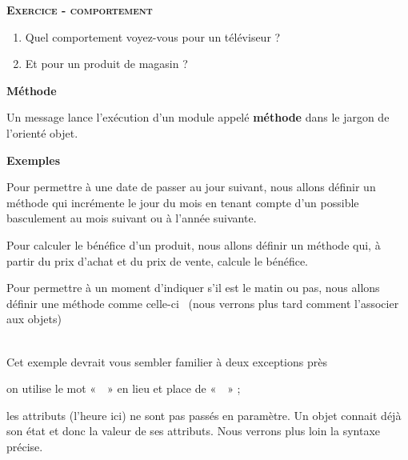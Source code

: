 {\sffamily\bfseries\scshape
Exercice - comportement}

\begin{enumerate}
	\item {
		Quel comportement voyez-vous pour un téléviseur ?}
	\item {
		Et pour un produit de magasin ?}
\end{enumerate}

\bigskip

{\sffamily\bfseries\upshape
Méthode}

{Un message lance l'exécution d'un
module appelé \textbf{méthode} dans le jargon de
l'orienté objet. }

{\bfseries
Exemples}

\begin{liste}
	\item {
		Pour permettre à une date de passer au jour suivant, nous allons définir
		un méthode qui incrémente le jour du mois en tenant compte
		d'un possible basculement au mois suivant ou à
		l'année suivante.}
	\item {
		Pour calculer le bénéfice d'un produit, nous allons définir
		un méthode qui, à partir du prix d'achat et du prix de vente,
		calcule le bénéfice.}
	
	\item {
		Pour permettre à un moment d'indiquer
		s'il est le matin ou pas, nous allons définir une
		méthode comme celle-ci \ (nous verrons plus tard comment
		l'associer aux objets)}

		\bigskip

		\\
		\bigskip
		{
		Cet exemple devrait vous sembler familier à deux exceptions près}

		\liststyleListv
		\begin{liste}
			\item {
				on utilise le mot «~~» en lieu et place de
				«~~» ;}
			\item {
				les attributs (l'heure ici) ne sont pas passés en
				paramètre. Un objet connait déjà son état et donc la valeur de ses
				attributs. Nous verrons plus loin la syntaxe précise.}
	\end{liste}
\end{liste}


